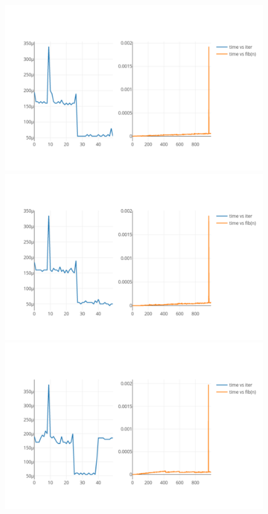 \documentclass[onecolumn]{preport}
\begin{document}
\begin{figure}[H]
\begin{center}
\begin{minipage}{0.23\columnwidth}
      \subcaption{}
    \end{minipage}
    \begin{minipage}{0.23\columnwidth}   
      \includegraphics[width=\columnwidth]{figs/newplot7.pdf}
      \subcaption{}
    \end{minipage}
    \begin{minipage}{0.23\columnwidth}   
      \includegraphics[width=\columnwidth]{figs/newplot8.pdf}
      \subcaption{}
    \end{minipage}
    \begin{minipage}{0.23\columnwidth}   
      \includegraphics[width=\columnwidth]{figs/newplot9.pdf}

\end{minipage}
\end{center}
\end{figure}
\end{document}
